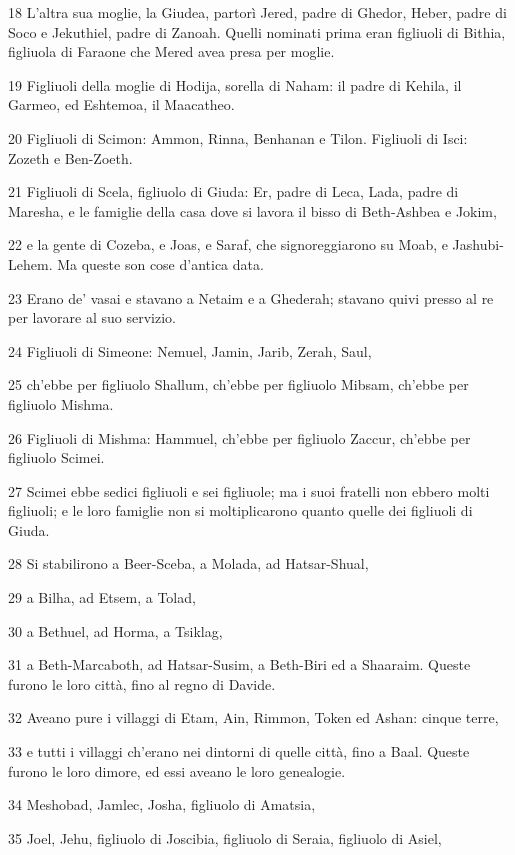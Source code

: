 \par 18 L'altra sua moglie, la Giudea, partorì Jered, padre di Ghedor, Heber, padre di Soco e Jekuthiel, padre di Zanoah. Quelli nominati prima eran figliuoli di Bithia, figliuola di Faraone che Mered avea presa per moglie.
\par 19 Figliuoli della moglie di Hodija, sorella di Naham: il padre di Kehila, il Garmeo, ed Eshtemoa, il Maacatheo.
\par 20 Figliuoli di Scimon: Ammon, Rinna, Benhanan e Tilon. Figliuoli di Isci: Zozeth e Ben-Zoeth.
\par 21 Figliuoli di Scela, figliuolo di Giuda: Er, padre di Leca, Lada, padre di Maresha, e le famiglie della casa dove si lavora il bisso di Beth-Ashbea e Jokim,
\par 22 e la gente di Cozeba, e Joas, e Saraf, che signoreggiarono su Moab, e Jashubi-Lehem. Ma queste son cose d'antica data.
\par 23 Erano de' vasai e stavano a Netaim e a Ghederah; stavano quivi presso al re per lavorare al suo servizio.
\par 24 Figliuoli di Simeone: Nemuel, Jamin, Jarib, Zerah, Saul,
\par 25 ch'ebbe per figliuolo Shallum, ch'ebbe per figliuolo Mibsam, ch'ebbe per figliuolo Mishma.
\par 26 Figliuoli di Mishma: Hammuel, ch'ebbe per figliuolo Zaccur, ch'ebbe per figliuolo Scimei.
\par 27 Scimei ebbe sedici figliuoli e sei figliuole; ma i suoi fratelli non ebbero molti figliuoli; e le loro famiglie non si moltiplicarono quanto quelle dei figliuoli di Giuda.
\par 28 Si stabilirono a Beer-Sceba, a Molada, ad Hatsar-Shual,
\par 29 a Bilha, ad Etsem, a Tolad,
\par 30 a Bethuel, ad Horma, a Tsiklag,
\par 31 a Beth-Marcaboth, ad Hatsar-Susim, a Beth-Biri ed a Shaaraim. Queste furono le loro città, fino al regno di Davide.
\par 32 Aveano pure i villaggi di Etam, Ain, Rimmon, Token ed Ashan: cinque terre,
\par 33 e tutti i villaggi ch'erano nei dintorni di quelle città, fino a Baal. Queste furono le loro dimore, ed essi aveano le loro genealogie.
\par 34 Meshobad, Jamlec, Josha, figliuolo di Amatsia,
\par 35 Joel, Jehu, figliuolo di Joscibia, figliuolo di Seraia, figliuolo di Asiel,

